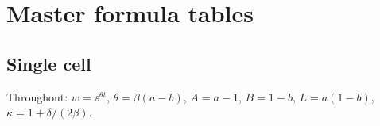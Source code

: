 
\section{Master formula tables}
\label{app:formula-tables}

\subsection*{Single cell}

Throughout: $w=\ee^{\theta t}$, $\theta=\beta(a-b)$, $A=a-1$, $B=1-b$,
$L=a(1-b)$, $\kappa=1+\delta/(2\beta)$.

